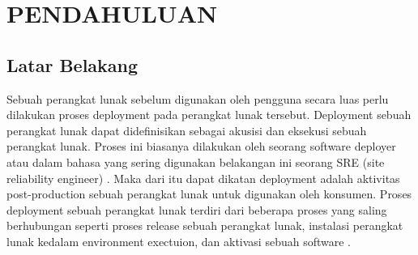 \renewcommand{\chaptername}{BAB}
\chapter{PENDAHULUAN}

\vspace{4.5pt}
\setlength{\parskip}{0.5em}

\section{Latar Belakang} \label{sec:latar_belakang}
Sebuah perangkat lunak sebelum digunakan oleh pengguna secara luas perlu dilakukan proses deployment
pada perangkat lunak tersebut. Deployment sebuah perangkat lunak dapat didefinisikan sebagai akusisi
dan eksekusi sebuah perangkat lunak. Proses ini biasanya dilakukan oleh seorang software deployer atau dalam bahasa yang sering
digunakan belakangan ini seorang SRE (site reliability engineer)  \cite{Lyu2007}.
Maka dari itu dapat dikatan deployment adalah aktivitas post-production sebuah perangkat lunak untuk digunakan oleh konsumen.
Proses deployment sebuah perangkat lunak terdiri dari beberapa proses yang saling berhubungan seperti proses release sebuah perangkat lunak,
instalasi perangkat lunak kedalam environment exectuion, dan aktivasi sebuah software  \cite{Carzaniga1998}.

